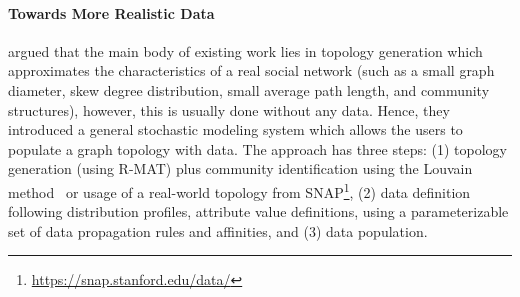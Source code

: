 \paragraph{Towards More Realistic Data} \cite{Nettleton2016} argued that the main body of existing work lies in
topology generation which approximates the characteristics of a real social
network (such as a small graph diameter, skew degree
distribution, small average path length, and community structures), however,  this is usually done without any data. Hence, they
introduced a general stochastic modeling system which allows the users to
populate a graph topology with data. The approach has three steps: (1) topology
generation (using R-MAT) plus community identification using the Louvain
method~\cite{1742-5468-2008-10-P10008} or usage of a real-world topology from
SNAP\footnote{\url{https://snap.stanford.edu/data/}}, (2) data definition
following distribution profiles, attribute value definitions, using a
parameterizable set of data propagation rules and affinities, and (3) data
population.


